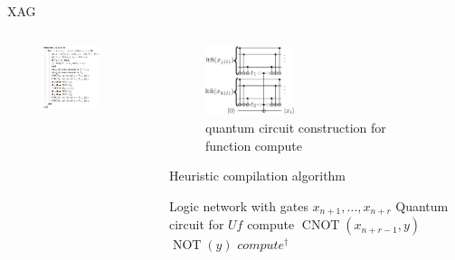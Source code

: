 \begin{frame}{XAG}
  \begin{columns}
    \begin{column}{0.48\linewidth}
      \begin{figure}[h]
        \centering
        \includegraphics[width=0.8\textwidth]{figure/function.png}
        \label{fig-function}
      \end{figure}
    \end{column}
    \begin{column}{0.48\linewidth}
      \begin{figure}[h]
        \centering
        \includegraphics[width=0.4\textwidth]{figure/construction.png}
        \caption{quantum circuit construction for function compute}
        \label{fig-construction}
      \end{figure}
      \begin{algorithm}[H]
         \scriptsize
        \caption{Heuristic compilation algorithm} 
        \label{alg-be} 
        \begin{algorithmic}
          \REQUIRE Logic network with gates $x_{n+1}, \dots, x_{n+r}$
          \ENSURE Quantum circuit for $Uf$
          \STATE compute
          \STATE $\operatorname{CNOT}(x_{n+r-1},y)$
          \STATE $\operatorname{NOT}(y)$
          \ENDIF
          \STATE $compute^{\dagger}$
        \end{algorithmic} 
      \end{algorithm}
    \end{column}
  \end{columns}
\end{frame}

